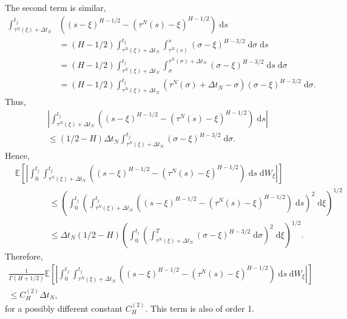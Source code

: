 \documentclass[reqno,12pt]{amsart}
\theoremstyle{plain} %
\theoremstyle{definition} %
\begin{document}
The second term is similar,
\begin{align*}
    \int_{\tau^N(\xi)+\Delta t_N}^{t_j} & \left( (s-\xi)^{H-1/2} - (\tau^N(s)-\xi)^{H-1/2}\right) \;\mathrm{d}s \\ 
    & = (H-1/2)\int_{\tau^N(\xi)+\Delta t_N}^{t_j} \int_{\tau^N(s)}^s (\sigma - \xi)^{H - 3/2} \;\mathrm{d}\sigma \;\mathrm{d}s \\
    & = (H-1/2)\int_{\tau^N(\xi)+\Delta t_N}^{t_j} \int_\sigma^{\tau^N(\sigma) + \Delta t_N} (\sigma - \xi)^{H - 3/2} \;\mathrm{d}s \;\mathrm{d}\sigma \\
    & = (H-1/2)\int_{\tau^N(\xi)+\Delta t_N}^{t_j} \left(\tau^N(\sigma) + \Delta t_N - \sigma\right) (\sigma - \xi)^{H - 3/2} \;\mathrm{d}\sigma.
\end{align*}
Thus,
\begin{multline*}
    \left| \int_{\tau^N(\xi)+\Delta t_N}^{t_j} \left( (s-\xi)^{H-1/2} - (\tau^N(s)-\xi)^{H-1/2}\right) \;\mathrm{d}s \right| \\
    \leq (1/2 - H)\Delta t_N \int_{\tau^N(\xi)+\Delta t_N}^{t_j} (\sigma - \xi)^{H - 3/2} \;\mathrm{d}\sigma.
\end{multline*}
Hence,
\begin{align*}
    & \mathbb{E}\left[\left|\int_{0}^{t_j} \int_{\tau^N(\xi)+\Delta t_N}^{t_j} \left( (s-\xi)^{H-1/2} - (\tau^N(s)-\xi)^{H-1/2}\right) \;\mathrm{d}s \;\mathrm{d}W_\xi\right|\right] \\
    & \qquad\qquad \leq \left(\int_{0}^{t_j} \left(\int_{\tau^N(\xi)+\Delta t_N}^{t_j} \left( (s-\xi)^{H-1/2} - (\tau^N(s)-\xi)^{H-1/2}\right) \;\mathrm{d}s \right)^2 \;\mathrm{d}\xi \right)^{1/2} \\
    & \qquad\qquad \leq \Delta t_N (1/2 - H)\left(\int_{0}^{t_j} \left( \int_{\tau^N(\xi)+\Delta t_N}^{T} (\sigma - \xi)^{H-3/2} \;\mathrm{d}\sigma \right)^2 \;\mathrm{d}\xi \right)^{1/2}.
\end{align*}
Therefore,
\begin{multline}
    \label{secondtermfBm}
    \frac{1}{\Gamma(H + 1/2)}\mathbb{E}\left[\left|\int_{0}^{t_j} \int_{\tau^N(\xi)+\Delta t_N}^{t_j} \left( (s-\xi)^{H-1/2} - (\tau^N(s)-\xi)^{H-1/2}\right)  \;\mathrm{d}s \;\mathrm{d}W_\xi\right|\right] \\
    \leq C_H^{(2)}\Delta t_N,
\end{multline}
for a possibly different constant $C_H^{(2)}$. This term is also of order 1.
\end{document}
